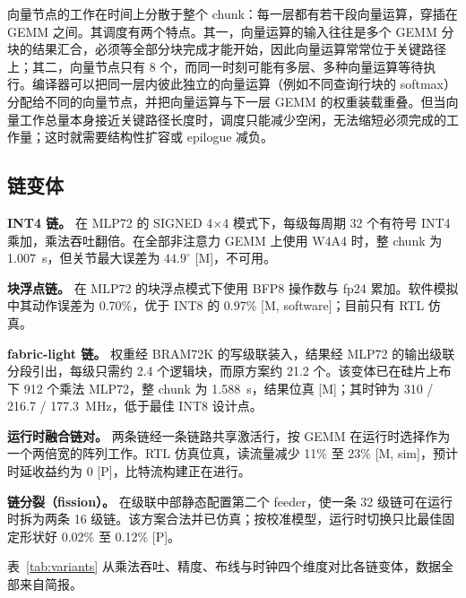 \documentclass[a4paper,10.5pt]{ctexart}
\newcommand{\tM}{\textsf{[M]}}              %
\newcommand{\tP}{\textsf{[P]}}              %
\newcommand{\tMsim}{\textsf{[M, sim]}}      %
\newcommand{\tMsw}{\textsf{[M, software]}}  %
\begin{document}
向量节点的工作在时间上分散于整个 chunk：每一层都有若干段向量运算，穿插在 GEMM 之间。其调度有两个特点。其一，向量运算的输入往往是多个 GEMM 分块的结果汇合，必须等全部分块完成才能开始，因此向量运算常常位于关键路径上；其二，向量节点只有 8 个，而同一时刻可能有多层、多种向量运算等待执行。编译器可以把同一层内彼此独立的向量运算（例如不同查询行块的 softmax）分配给不同的向量节点，并把向量运算与下一层 GEMM 的权重装载重叠。但当向量工作总量本身接近关键路径长度时，调度只能减少空闲，无法缩短必须完成的工作量；这时就需要结构性扩容或 epilogue 减负。

\subsection{链变体}\label{sec:variants}

\textbf{INT4 链。} 在 MLP72 的 SIGNED 4$\times$4 模式下，每级每周期 32 个有符号 INT4 乘加，乘法吞吐翻倍。在全部非注意力 GEMM 上使用 W4A4 时，整 chunk 为 1.007~s，但关节最大误差为 $44.9^\circ$ \tM，不可用。

\textbf{块浮点链。} 在 MLP72 的块浮点模式下使用 BFP8 操作数与 fp24 累加。软件模拟中其动作误差为 0.70\%，优于 INT8 的 0.97\% \tMsw；目前只有 RTL 仿真。

\textbf{fabric-light 链。} 权重经 BRAM72K 的写级联装入，结果经 MLP72 的输出级联分段引出，每级只需约 2.4 个逻辑块，而原方案约 21.2 个。该变体已在硅片上布下 912 个乘法 MLP72，整 chunk 为 1.588~s，结果位真 \tM；其时钟为 310 / 216.7 / 177.3~MHz，低于最佳 INT8 设计点。

\textbf{运行时融合链对。} 两条链经一条链路共享激活行，按 GEMM 在运行时选择作为一个两倍宽的阵列工作。RTL 仿真位真，读流量减少 11\% 至 23\% \tMsim，预计时延收益约为 0 \tP，比特流构建正在进行。

\textbf{链分裂（fission）。} 在级联中部静态配置第二个 feeder，使一条 32 级链可在运行时拆为两条 16 级链。该方案合法并已仿真；按校准模型，运行时切换只比最佳固定形状好 0.02\% 至 0.12\% \tP。

表~\ref{tab:variants} 从乘法吞吐、精度、布线与时钟四个维度对比各链变体，数据全部来自简报。
\end{document}
